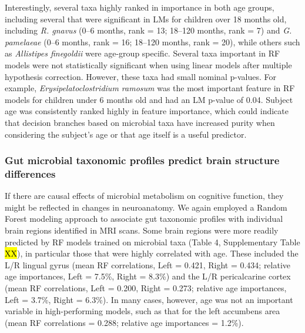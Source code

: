 \documentclass{article}
\begin{document}
Interestingly, several taxa highly ranked in importance in both age
groups, including several that were significant in LMs for children over
18 months old, including \emph{R. gnavus} (0--6 months, rank = 13;
18--120 months, rank = 7) and \emph{G. pamelaeae} (0--6 months, rank =
16; 18--120 months, rank = 20), while others such as \emph{Allistipes
finegoldii} were age-group specific. Several taxa important in RF models
were not statistically significant when using linear models after
multiple hypothesis correction. However, these taxa had small nominal
p-values. For example, \emph{Erysipelatoclostridium ramosum} was the
most important feature in RF models for children under 6 months old and
had an LM p-value of 0.04. Subject age was consistently ranked highly in
feature importance, which could indicate that decision branches based on
microbial taxa have increased purity when considering the subject's age
or that age itself is a useful predictor.

\subsubsection*{Gut microbial taxonomic profiles predict brain structure differences}

If there are causal effects of microbial metabolism on cognitive
function, they might be reflected in changes in neuroanatomy. We again
employed a Random Forest modeling approach to associate gut taxonomic
profiles with individual brain regions identified in MRI scans.
Some brain regions were more readily
predicted by RF models trained on microbial taxa (Table 4, Supplementary
Table \hl{XX}), in particular those that were highly correlated with age.
These included the L/R lingual gyrus (mean RF correlations, Left =
0.421, Right = 0.434; relative age importances, Left = 7.5\%, Right =
8.3\%) and the L/R pericalcarine cortex (mean RF correlations, Left =
0.200, Right = 0.273; relative age importances, Left = 3.7\%, Right =
6.3\%). In many cases, however, age was not an important variable in
high-performing models, such as that for the left accumbens area (mean
RF correlations = 0.288; relative age importances = 1.2\%).
\end{document}
